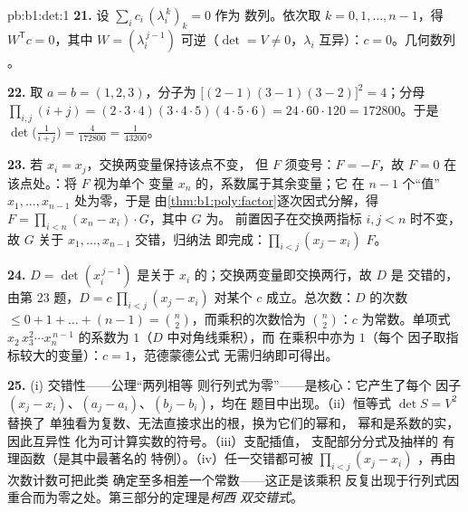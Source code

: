 \begin{solution}{pb:b1:det:1}
\textbf{21.} 设 $\sum_i c_i\,(\lambda_i^{\,k})_{k} = 0$ 作为
数列。依次取 $k = 0, 1, \dots, n-1$，得 $W^{\mathsf
T}c = 0$，其中 $W = (\lambda_i^{\,j-1})$ 可逆（$\det = V
\neq 0$，$\lambda_i$ 互异）：$c = 0$。几何数列
。

\textbf{22.} 取 $a = b = (1, 2, 3)$，分子为 $\bigl[(2-1)(3-1)
(3-2)\bigr]^2 = 4$；分母 $\prod_{i,j}(i + j) =
(2\cdot3\cdot4)(3\cdot4\cdot5)(4\cdot5\cdot6) = 24\cdot60\cdot120
= 172800$。于是 $\det\bigl(\frac1{i+j}\bigr) = \frac{4}{172800}
= \frac1{43200}$。

\textbf{23.} 若 $x_i = x_j$，交换两变量保持该点不变，
但 $F$ 须变号：$F = -F$，故 $F = 0$
在该点处。：将 $F$ 视为单个
变量 $x_n$ 的，系数属于其余变量；它
在 $n - 1$ 个“值” $x_1, \dots, x_{n-1}$ 处为零，于是
由\cref{thm:b1:poly:factor}逐次因式分解，得 $F =
\prod_{i<n}(x_n - x_i)\cdot G$，其中 $G$ 为。
前置因子在交换两指标 $i, j < n$ 时不变，故
$G$ 关于 $x_1, \dots, x_{n-1}$ 交错，归纳法
即完成：$\prod_{i<j}(x_j - x_i)$  $F$。

\textbf{24.} $D = \det(x_i^{\,j-1})$ 是关于
$x_i$ 的；交换两变量即交换两行，故 $D$ 是
交错的，由第 23 题，$D = c\,\prod_{i<j}(x_j - x_i)$
对某个 $c$ 成立。总次数：$D$ 的次数 $\leq 0 +
1 + \dots + (n-1) = \binom n2$，而乘积的次数恰为
$\binom n2$：$c$ 为常数。单项式 $x_2\,x_3^2\cdots
x_n^{\,n-1}$ 的系数为 $1$（$D$ 中对角线乘积），而
在乘积中亦为 $1$（每个
因子取指标较大的变量）：$c = 1$，范德蒙德公式
无需归纳即可得出。

\textbf{25.} (i) 交错性——公理“两列相等
则行列式为零”——是核心：它产生了每个
因子 $(x_j - x_i)$、$(a_j - a_i)$、$(b_j - b_i)$，均在
题目中出现。（ii）恒等式 $\det S = V^2$ 替换了
单独看为复数、无法直接求出的根，换为它们的幂和，
幂和是系数的实，因此互异性
化为可计算实数的符号。（iii）支配插值，
支配部分分式及抽样的
有理函数（是其中最著名的
特例）。（iv）任一交错都可被
$\prod_{i<j}(x_j - x_i)$ ，再由次数计数可把此类
确定至多相差一个常数——这正是该乘积
反复出现于行列式因
重合而为零之处。第三部分的定理是\emph{柯西
双交错式}。
\end{solution}
